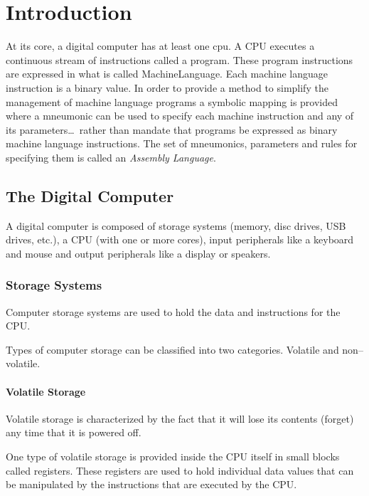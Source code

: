 \chapter{Introduction}
\label{chapter:Introduction}

At its core, a digital computer has at least one \acrfull{cpu}.  A
CPU executes a continuous stream of instructions called a \gls{program}.  
These program instructions are expressed in what is called 
\gls{MachineLanguage}.  Each machine language instruction is a binary value.  
In order to provide a method to simplify the management of machine language 
programs a symbolic mapping is provided where a mneumonic can be used to 
specify each machine instruction and any of its parameters\ldots\ rather 
than mandate that programs be expressed as binary machine language 
instructions.  The set of mneumonics, parameters and rules for specifying 
them is called an {\em Assembly Language}.

\section{The Digital Computer}

A digital computer is composed of storage systems (memory, disc drives,
USB drives, etc.), a CPU (with one or more cores), input peripherals like 
a keyboard and mouse and output peripherals like a display or speakers.

\subsection{Storage Systems}

Computer storage systems are used to hold the data and instructions
for the CPU.

Types of computer storage can be classified into two categories.
Volatile and non--volatile.

\subsubsection{Volatile Storage}

Volatile storage is characterized by the fact that it will lose its
contents (forget) any time that it is powered off.

One type of volatile storage is provided inside the CPU itself in 
small blocks called \glspl{register}.  These registers are used to 
hold individual data values that can be manipulated by the instructions
that are executed by the CPU.  

